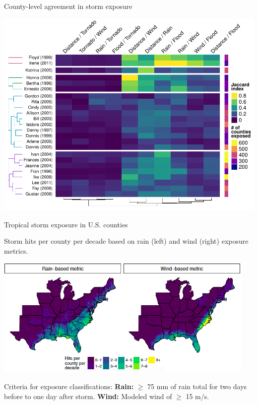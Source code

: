 \documentclass[ignorenonframetext,]{beamer}
\begin{document}
\begin{frame}{County-level agreement in storm exposure}

\vspace{-0.3cm}

\begin{center}\includegraphics[height=0.87\textheight]{jaccard_heatmap_presentation} \end{center}

\end{frame}

\begin{frame}{Tropical storm exposure in U.S. counties}

\begin{centering}
\small Storm hits per county per decade based on rain (left) and wind (right) exposure metrics.
\end{centering}

\begin{center}\includegraphics[width=0.95\textwidth]{hurricane_exposure} \end{center}

\vspace{-0.7cm} \scriptsize Criteria for exposure classifications:
\textbf{Rain:} \(\ge\) 75 mm of rain total for two days before to one
day after storm. \textbf{Wind:} Modeled wind of \(\ge\) 15 m/s.

\end{frame}
\end{document}
